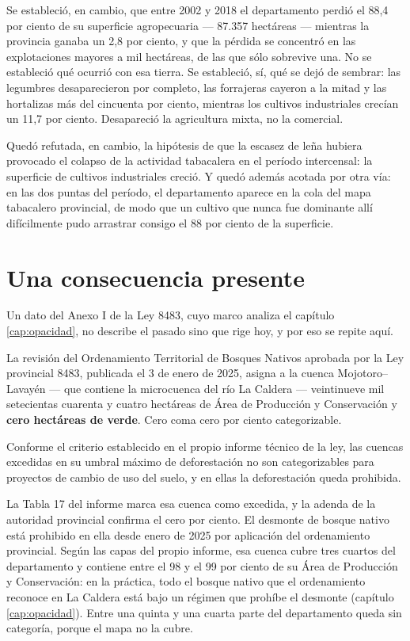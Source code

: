 Se estableció, en cambio, que entre 2002 y 2018 el departamento perdió el 88,4 por ciento de su superficie agropecuaria --- 87.357 hectáreas --- mientras la provincia ganaba un 2,8 por ciento, y que la pérdida se concentró en las explotaciones mayores a mil hectáreas, de las que sólo sobrevive una. No se estableció qué ocurrió con esa tierra. Se estableció, sí, qué se dejó de sembrar: las legumbres desaparecieron por completo, las forrajeras cayeron a la mitad y las hortalizas más del cincuenta por ciento, mientras los cultivos industriales crecían un 11,7 por ciento. Desapareció la agricultura mixta, no la comercial.

Quedó refutada, en cambio, la hipótesis de que la escasez de leña hubiera provocado el colapso de la actividad tabacalera en el período intercensal: la superficie de cultivos industriales creció. Y quedó además acotada por otra vía: en las dos puntas del período, el departamento aparece en la cola del mapa tabacalero provincial, de modo que un cultivo que nunca fue dominante allí difícilmente pudo arrastrar consigo el 88 por ciento de la superficie.

\section{Una consecuencia presente}

Un dato del Anexo I de la Ley 8483, cuyo marco analiza el capítulo \ref{cap:opacidad}, no describe el pasado sino que rige hoy, y por eso se repite aquí.

La revisión del Ordenamiento Territorial de Bosques Nativos aprobada por la Ley provincial 8483, publicada el 3 de enero de 2025, asigna a la cuenca Mojotoro--Lavayén --- que contiene la microcuenca del río La Caldera --- veintinueve mil setecientas cuarenta y cuatro hectáreas de Área de Producción y Conservación y \textbf{cero hectáreas de verde}. Cero coma cero por ciento categorizable.

Conforme el criterio establecido en el propio informe técnico de la ley, las cuencas excedidas en su umbral máximo de deforestación no son categorizables para proyectos de cambio de uso del suelo, y en ellas la deforestación queda prohibida.

La Tabla 17 del informe marca esa cuenca como excedida, y la adenda de la autoridad provincial confirma el cero por ciento. El desmonte de bosque nativo está prohibido en ella desde enero de 2025 por aplicación del ordenamiento provincial. Según las capas del propio informe, esa cuenca cubre tres cuartos del departamento y contiene entre el 98 y el 99 por ciento de su Área de Producción y Conservación: en la práctica, todo el bosque nativo que el ordenamiento reconoce en La Caldera está bajo un régimen que prohíbe el desmonte (capítulo \ref{cap:opacidad}). Entre una quinta y una cuarta parte del departamento queda sin categoría, porque el mapa no la cubre.

